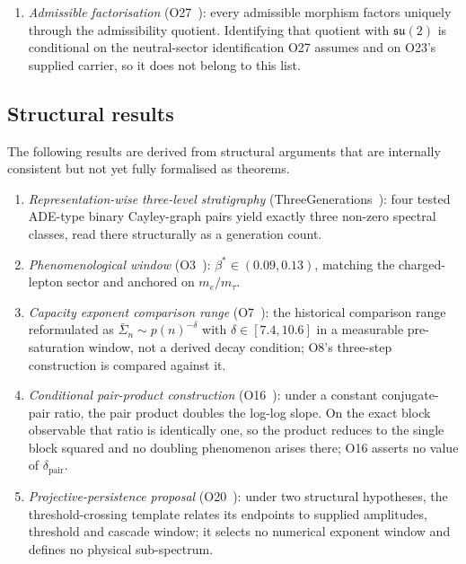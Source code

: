 \documentclass[11pt,a4paper]{article}
\theoremstyle{definition}
\newcommand{\su}{\mathfrak{su}}
\newcommand{\dimpair}{\delta_{\mathrm{pair}}}
\newcommand{\betastar}{\beta^*}
\begin{document}
\begin{enumerate}
        \item \textit{Admissible factorisation} (O27~\cite{Beau2026a31}): every admissible
        morphism factors uniquely through the admissibility quotient.
        Identifying that quotient with $\su(2)$ is conditional on the neutral-sector identification
        O27 assumes and on O23's supplied carrier, so it does not belong to this list.
      \end{enumerate}

    \subsection{Structural results}
      \label{sec:structural}

      The following results are derived from structural arguments that are internally consistent
      but not yet fully formalised as theorems.

      \begin{enumerate}
        \item \textit{Representation-wise three-level stratigraphy}
        (ThreeGenerations~\cite{Beau2026a4}): four tested ADE-type binary Cayley-graph pairs yield
        exactly three non-zero spectral classes, read there structurally as a generation count.

        \item \textit{Phenomenological window} (O3~\cite{Beau2026a7}): $\betastar \in (0.09, 0.13)$,
        matching the charged-lepton sector and anchored on $m_e/m_\tau$.

        \item \textit{Capacity exponent comparison range} (O7~\cite{Beau2026a11}): the historical
        comparison range reformulated as $\bar\Sigma_n \sim p(n)^{-\delta}$ with $\delta \in [7.4, 10.6]$
        in a measurable pre-saturation window, not a derived decay condition; O8's three-step
        construction is compared against it.

        \item \textit{Conditional pair-product construction} (O16~\cite{Beau2026a20}): under a
        constant conjugate-pair ratio, the pair product doubles the log-log slope.
        On the exact block observable that ratio is identically one, so the product reduces to the
        single block squared and no doubling phenomenon arises there; O16 asserts no value of
        $\dimpair$.

        \item \textit{Projective-persistence proposal} (O20~\cite{Beau2026a24}): under two
        structural hypotheses, the threshold-crossing template relates its endpoints to supplied
        amplitudes, threshold and cascade window; it selects no numerical exponent window
        and defines no physical sub-spectrum.

      \end{enumerate}
\end{document}
